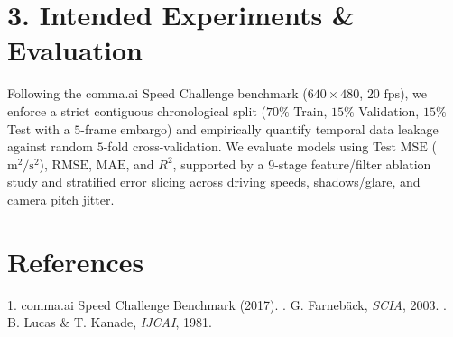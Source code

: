 \documentclass[11pt]{article}
\begin{document}
\section*{3. Intended Experiments \& Evaluation}
Following the comma.ai Speed Challenge benchmark ($640 \times 480$, $20\text{ fps}$), we enforce a strict contiguous chronological split ($70\%$ Train, $15\%$ Validation, $15\%$ Test with a $5$-frame embargo) and empirically quantify temporal data leakage against random $5$-fold cross-validation. We evaluate models using Test $\text{MSE}$ ($\text{m}^2/\text{s}^2$), $\text{RMSE}$, $\text{MAE}$, and $R^2$, supported by a 9-stage feature/filter ablation study and stratified error slicing across driving speeds, shadows/glare, and camera pitch jitter.

\section*{References}
\small
1. comma.ai Speed Challenge Benchmark (2017). . G. Farneb\"{a}ck, \emph{SCIA}, 2003. . B. Lucas \& T. Kanade, \emph{IJCAI}, 1981.
\end{document}
